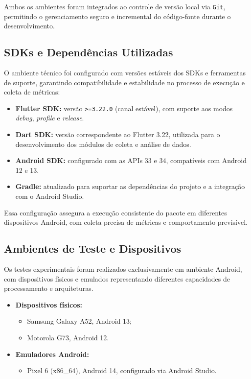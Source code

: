 Ambos os ambientes foram integrados ao controle de versão local via \texttt{Git}, permitindo o gerenciamento seguro e incremental do código-fonte durante o desenvolvimento.

\subsection{SDKs e Dependências Utilizadas}

O ambiente técnico foi configurado com versões estáveis dos SDKs e ferramentas de suporte, garantindo compatibilidade e estabilidade no processo de execução e coleta de métricas:

\begin{itemize}
  \item \textbf{Flutter SDK:} versão \texttt{>=3.22.0} (canal estável), com suporte aos modos \textit{debug}, \textit{profile} e \textit{release}.
  \item \textbf{Dart SDK:} versão correspondente ao Flutter 3.22, utilizada para o desenvolvimento dos módulos de coleta e análise de dados.
  \item \textbf{Android SDK:} configurado com as APIs 33 e 34, compatíveis com Android 12 e 13.
  \item \textbf{Gradle:} atualizado para suportar as dependências do projeto e a integração com o Android Studio.
\end{itemize}

Essa configuração assegura a execução consistente do pacote em diferentes dispositivos Android, com coleta precisa de métricas e comportamento previsível.

\subsection{Ambientes de Teste e Dispositivos}

Os testes experimentais foram realizados exclusivamente em ambiente Android, com dispositivos físicos e emulados representando diferentes capacidades de processamento e arquiteturas.

\begin{itemize}
  \item \textbf{Dispositivos físicos:}
    \begin{itemize}
      \item Samsung Galaxy A52, Android 13;
      \item Motorola G73, Android 12.
    \end{itemize}
  \item \textbf{Emuladores Android:}
    \begin{itemize}
      \item Pixel 6 (x86\_64), Android 14, configurado via Android Studio.
    \end{itemize}
\end{itemize}


